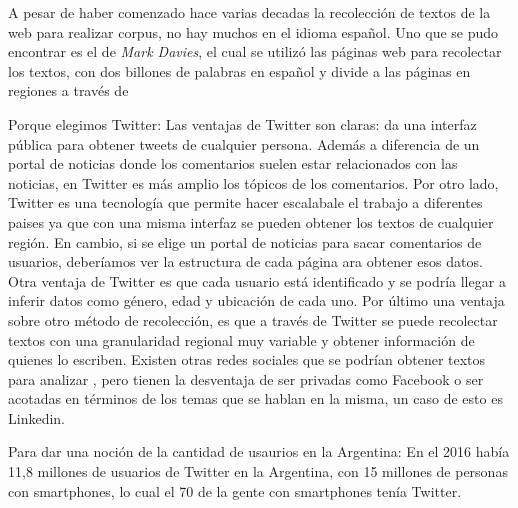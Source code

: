 A pesar de haber comenzado hace varias decadas la recolección de textos de la web para realizar corpus, no hay muchos en el idioma español.
Uno que se pudo encontrar es el de \textit{Mark Davies}, el cual se utilizó las páginas web para recolectar los textos, con dos billones de palabras en español y divide a las páginas en regiones a través de  

Porque elegimos Twitter:
Las ventajas de Twitter son claras: da una interfaz pública para obtener tweets de cualquier persona. Además a diferencia de un portal de noticias donde los comentarios suelen estar relacionados con las noticias, en Twitter es más amplio los tópicos de los comentarios.
Por otro lado, Twitter es una tecnología que permite hacer escalabale el trabajo a diferentes paises ya que con una misma interfaz se pueden obtener los textos de cualquier región. En cambio, si se elige un portal de noticias para sacar comentarios de usuarios, deberíamos ver la estructura de cada página ara obtener esos datos.
Otra ventaja de Twitter es que cada usuario está identificado y se podría llegar a inferir datos como género, edad y ubicación de cada uno.
Por último una ventaja sobre otro método de recolección, es que a través de Twitter se puede recolectar textos con una granularidad regional muy variable y obtener información de quienes lo escriben.
Existen otras redes sociales que se podrían obtener textos para analizar , pero tienen la desventaja de ser privadas como Facebook o ser acotadas en términos de los temas que se hablan en la misma, un caso de esto es Linkedin. 

Para dar una noción de la cantidad de usaurios en la Argentina:
En el 2016 había 11,8 millones de usuarios de Twitter en la Argentina, con 15 millones de personas con smartphones, lo cual el 70 de la gente con smartphones tenía Twitter.
